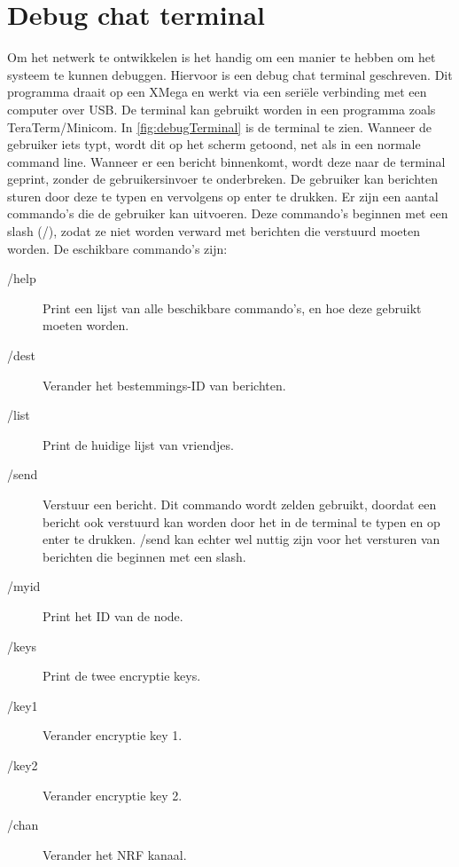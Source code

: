 \section{Debug chat terminal} \label{sec:debugProgram}
Om het netwerk te ontwikkelen is het handig om een manier te hebben om het systeem te kunnen debuggen. Hiervoor is een debug chat terminal geschreven. Dit programma draait op een XMega en werkt via een seriële verbinding met een computer over USB. De terminal kan gebruikt worden in een programma zoals TeraTerm/Minicom. In \autoref{fig:debugTerminal} is de terminal te zien. Wanneer de gebruiker iets typt, wordt dit op het scherm getoond, net als in een normale command line. Wanneer er een bericht binnenkomt, wordt deze naar de terminal geprint, zonder de gebruikersinvoer te onderbreken. De gebruiker kan berichten sturen door deze te typen en vervolgens op enter te drukken. Er zijn een aantal commando's die de gebruiker kan uitvoeren. Deze commando's beginnen met een slash (/), zodat ze niet worden verward met berichten die verstuurd moeten worden.
De eschikbare commando's zijn:

\begin{description}
    \item[/help] Print een lijst van alle beschikbare commando's, en hoe deze gebruikt moeten worden.

    \item[/dest] Verander het bestemmings-ID van berichten.

    \item[/list] Print de huidige lijst van vriendjes. 

    \item[/send] Verstuur een bericht. Dit commando wordt zelden gebruikt, doordat een bericht ook verstuurd kan worden door het in de terminal te typen en op enter te drukken. /send kan echter wel nuttig zijn voor het versturen van berichten die beginnen met een slash.

    \item[/myid] Print het ID van de node.

    \item[/keys] Print de twee encryptie keys.

    \item[/key1] Verander encryptie key 1.
    \item[/key2] Verander encryptie key 2. 

    \item[/chan] Verander het NRF kanaal. 
\end{description}


